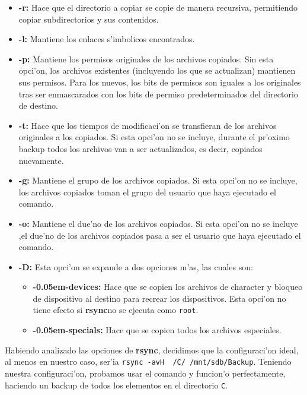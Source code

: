 \documentclass[11pt]{article}
\newcommand{\rsync}[0]{\textbf{rsync}}
\newcommand{\customitem}[1]{\item \textbf{#1:}}
\begin{document}
		\begin{itemize}
			\customitem{-r} Hace que el directorio a copiar se copie de manera recursiva, permitiendo copiar subdirectorios y sus contenidos.
			\customitem{-l} Mantiene los enlaces s'imbolicos encontrados.
			\customitem{-p} Mantiene los permisos originales de los archivos copiados. Sin esta opci'on, los archivos existentes (incluyendo los que se actualizan) mantienen sus permisos. Para los nuevos, los bits de permisos son iguales a los originales tras ser enmascarados con los bits de permiso predeterminados del directorio de destino.
			\customitem{-t} Hace que los tiempos de modificaci'on se transfieran de los archivos originales a los copiados. Si esta opci'on no se incluye, durante el pr'oximo backup todos los archivos van a ser actualizados, es decir, copiados nuevamente.
			\customitem{-g} Mantiene el grupo de los archivos copiados. Si esta opci'on no se incluye, los archivos copiados toman el grupo del usuario que haya ejecutado el comando.
			\customitem{-o} Mantiene el due'no de los archivos copiados. Si esta opci'on no se incluye ,el due'no de los archivos copiados pasa a ser el usuario que haya ejecutado el comando.
			\customitem{-D} Esta opci'on se expande a dos opciones m'as, las cuales son:
			\begin{itemize}
				\customitem{-{\kern 0.05em}-devices} Hace que se copien los archivos de character y bloqueo de dispositivo al destino para recrear los dispositivos. Esta opci'on no tiene efecto si \rsync no se ejecuta como \texttt{root}.
				\customitem{-{\kern 0.05em}-specials} Hace que se copien todos los archivos especiales.
			\end{itemize}
		\end{itemize}

		Habiendo analizado las opciones de \rsync, decidimos que la configuraci'on ideal, al menos en nuestro caso, ser'ia \texttt{rsync -avH ~/C/ /mnt/sdb/Backup}. Teniendo nuestra configuraci'on, probamos usar el comando y funcion'o perfectamente, haciendo un backup de todos los elementos en el directorio \texttt{C}.
\end{document}
